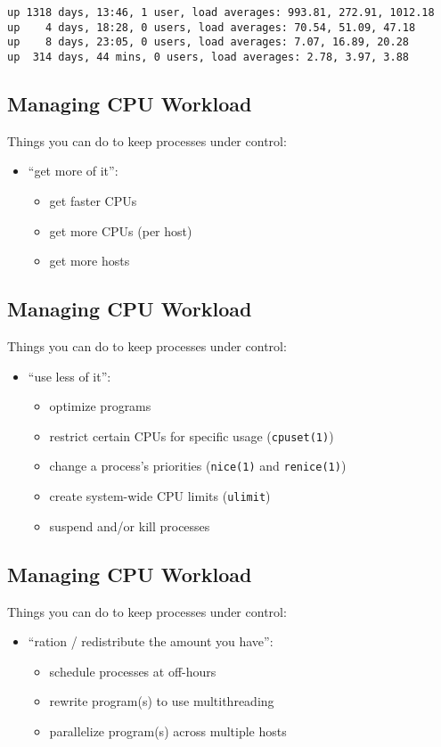 \documentclass[xga]{xdvislides}
\begin{document}
\vspace*{\fill}
\verb+up 1318 days, 13:46, 1 user, load averages: 993.81, 272.91, 1012.18+\\
\verb+up    4 days, 18:28, 0 users, load averages: 70.54, 51.09, 47.18+\\
\verb+up    8 days, 23:05, 0 users, load averages: 7.07, 16.89, 20.28+\\
\verb+up  314 days, 44 mins, 0 users, load averages: 2.78, 3.97, 3.88+ \\
\vspace*{\fill}

\subsection{Managing CPU Workload}
Things you can do to keep processes under control:
\begin{itemize}
	\item ``get more of it'':
		\begin{itemize}
			\item get faster CPUs
			\item get more CPUs (per host)
			\item get more hosts
		\end{itemize}
\end{itemize}

\subsection{Managing CPU Workload}
Things you can do to keep processes under control:
\begin{itemize}
	\item ``use less of it'':
		\begin{itemize}
			\item optimize programs
			\item restrict certain CPUs for specific usage (\verb+cpuset(1)+)
			\item change a process's priorities (\verb+nice(1)+ and
				\verb+renice(1)+)
			\item create system-wide CPU limits (\verb+ulimit+)
			\item suspend and/or kill processes
		\end{itemize}
\end{itemize}

\subsection{Managing CPU Workload}
Things you can do to keep processes under control:
\begin{itemize}
	\item ``ration / redistribute the amount you have'':
		\begin{itemize}
			\item schedule processes at off-hours
			\item rewrite program(s) to use multithreading
			\item parallelize program(s) across multiple hosts
		\end{itemize}
\end{itemize}
\end{document}
